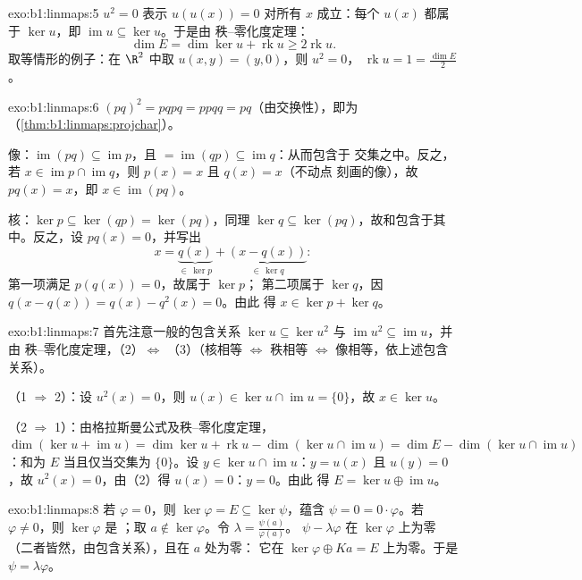 \begin{solution}{exo:b1:linmaps:5}
$u^2 = 0$ 表示 $u(u(x)) = 0$ 对所有 $x$ 成立：每个 $u(x)$ 都属于
$\ker u$，即 $\operatorname{im} u \subseteq \ker u$。于是由
秩–零化度定理：
\[
\dim E = \dim\ker u + \operatorname{rk} u \geq 2\operatorname{rk} u .
\]
取等情形的例子：在 $\R^2$ 中取 $u(x, y) = (y, 0)$，则 $u^2 = 0$，
$\operatorname{rk} u = 1 = \frac{\dim E}{2}$。
\end{solution}

\begin{solution}{exo:b1:linmaps:6}
$(pq)^2 = pqpq = ppqq = pq$（由交换性），即为
（\cref{thm:b1:linmaps:projchar}）。

像：$\operatorname{im}(pq) \subseteq \operatorname{im} p$，且
$= \operatorname{im}(qp) \subseteq \operatorname{im} q$：从而包含于
交集之中。反之，若 $x \in \operatorname{im} p \cap
\operatorname{im} q$，则 $p(x) = x$ 且 $q(x) = x$（不动点
刻画的像），故 $pq(x) = x$，即 $x \in
\operatorname{im}(pq)$。

核：$\ker p \subseteq \ker(qp) = \ker(pq)$，同理 $\ker q
\subseteq \ker(pq)$，故和包含于其中。反之，设 $pq(x) =
0$，并写出
\[
x = \underbrace{q(x)}_{\in\, \ker p} +
\underbrace{(x - q(x))}_{\in\, \ker q} :
\]
第一项满足 $p(q(x)) = 0$，故属于 $\ker p$；
第二项属于 $\ker q$，因 $q(x - q(x)) = q(x) - q^2(x) = 0$。由此
得 $x \in \ker p + \ker q$。
\end{solution}

\begin{solution}{exo:b1:linmaps:7}
首先注意一般的包含关系 $\ker u \subseteq \ker u^2$ 与
$\operatorname{im} u^2 \subseteq \operatorname{im} u$，并由
秩–零化度定理，（2）$\iff$ （3）（核相等 $\iff$ 秩相等
$\iff$ 像相等，依上述包含关系）。

（1 $\Rightarrow$ 2）：设 $u^2(x) = 0$，则 $u(x) \in \ker u \cap
\operatorname{im} u = \{0\}$，故 $x \in \ker u$。

（2 $\Rightarrow$ 1）：由格拉斯曼公式及秩–零化度定理，$\dim(\ker u +
\operatorname{im} u) = \dim\ker u + \operatorname{rk} u -
\dim(\ker u \cap \operatorname{im} u) = \dim E - \dim(\ker u \cap
\operatorname{im} u)$：和为 $E$ 当且仅当交集为
$\{0\}$。设 $y \in \ker u \cap \operatorname{im} u$：$y = u(x)$ 且
$u(y) = 0$，故 $u^2(x) = 0$，由（2）得 $u(x) = 0$：$y = 0$。由此
得 $E = \ker u \oplus \operatorname{im} u$。
\end{solution}

\begin{solution}{exo:b1:linmaps:8}
若 $\varphi = 0$，则 $\ker\varphi = E \subseteq \ker\psi$，蕴含
$\psi = 0 = 0\cdot\varphi$。若 $\varphi \neq 0$，则 $\ker\varphi$ 是
；取 $a \notin \ker\varphi$。令 $\lambda =
\frac{\psi(a)}{\varphi(a)}$。 $\psi - \lambda\varphi$
在 $\ker\varphi$ 上为零（二者皆然，由包含关系），且在 $a$ 处为零：
它在 $\ker\varphi \oplus Ka = E$ 上为零。于是 $\psi =
\lambda\varphi$。
\end{solution}

